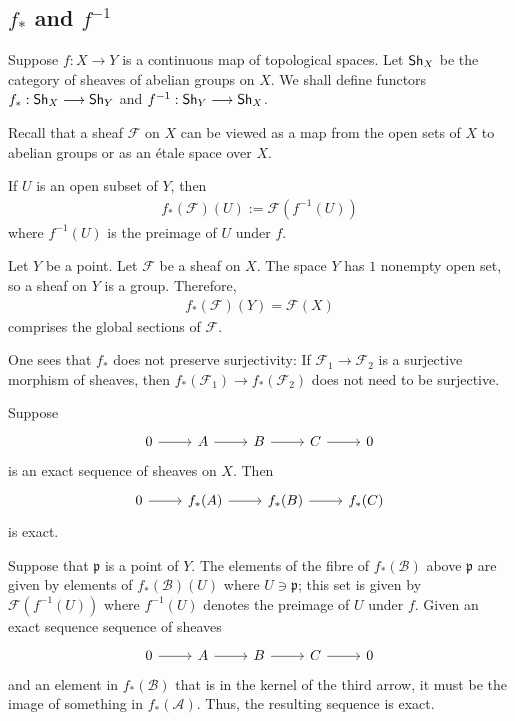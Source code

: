 \documentclass [11 pt, oneside] {article}
\begin{document}
\subsection{\texorpdfstring{$f_*$}{f*} and \texorpdfstring{$f^{-1}$}{f-1}}
Suppose $f:X\longrightarrow Y$ is a continuous map of topological spaces. Let $\textsf{Sh}_X$ be the category of sheaves of abelian groups on $X$. We shall define functors $f_* : \textsf{Sh}_X \longrightarrow \textsf{Sh}_Y$ and $f^{-1} : \textsf{Sh}_Y \longrightarrow \textsf{Sh}_X$.

Recall that a sheaf $\mathscr{F}$ on $X$ can be viewed as a map from the open sets of $X$ to abelian groups or as an \'etale space over $X$.

If $U$ is an open subset of $Y$, then
\begin{align*}
	f_*(\mathscr{F}) (U) :=  \mathscr{F}(f^{-1}(U))
\end{align*}
where $f^{-1}(U)$ is the preimage of $U$ under $f$.

\begin{example}[ ]\label{}\text{}
Let $Y$ be a point. Let $\mathscr{F}$ be a sheaf on $X$. The space $Y$ has $1$ nonempty open set, so a sheaf on $Y$ is a group. Therefore,
\begin{align*}
	f_*(\mathscr{F}) (Y) =  \mathscr{F}(X)
\end{align*}
comprises the global sections of $\mathscr{F}$.
\end{example}

One sees that $f_*$ does not preserve surjectivity: If $\mathscr{F}_1\longrightarrow \mathscr{F}_2$ is a surjective morphism of sheaves, then $f_*(\mathscr{F}_1)\longrightarrow f_*(\mathscr{F}_2)$ does not need to be surjective.

Suppose
\[
\begin{tikzcd}
	0 \ar[r] &\mathscr{A} \ar[r] &\mathscr{B} \ar[r] &\mathscr{C}\ar[r]&0
\end{tikzcd}
\]
is an exact sequence of sheaves on $X$. Then
\[
\begin{tikzcd}
	0 \ar[r]&f_*(\mathscr{A}) \ar[r] &f_*(\mathscr{B}) \ar[r] &f_*(\mathscr{C})
\end{tikzcd}
\]
is exact. 

Suppose that $\mathfrak p$ is a point of $Y$. The elements of the fibre of $f_*(\mathscr{B})$ above $\mathfrak p$ are given by elements of $f_*(\mathscr{B})(U)$ where $U\ni \mathfrak p$; this set is given by $\mathscr{F}(f^{-1}(U))$ where $f^{-1}(U)$ denotes the preimage of $U$ under $f$. Given an exact sequence sequence of sheaves
\[
\begin{tikzcd}
	 0 \ar[r] &\mathscr{A} \ar[r] &\mathscr{B} \ar[r] &\mathscr{C}\ar[r]&0
\end{tikzcd}
\]
and an element in $f_*(\mathscr{B})$ that is in the kernel of the third arrow, it must be the image of something in $f_*(\mathscr{A})$. Thus, the resulting sequence is exact.
\end{document}
